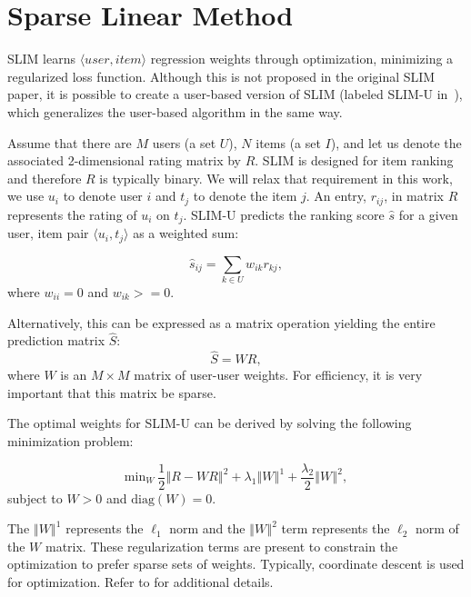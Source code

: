 \section{Sparse Linear Method}

SLIM learns $\langle user, item \rangle$ regression weights through optimization, minimizing a regularized loss function. Although this is not proposed in the original SLIM paper, it is possible to create a user-based version of SLIM (labeled SLIM-U in~\cite{zheng2014cslim}), which generalizes the user-based algorithm in the same way. 

Assume that there are $M$ users (a set $U$), $N$ items (a set $I$), and let us denote the associated 2-dimensional rating matrix by $R$. SLIM is designed for item ranking and therefore $R$ is typically binary. We will relax that requirement in this work, we use $u_i$ to denote user $i$ and $t_j$ to denote the item $j$. An entry, $r_{ij}$, in matrix $R$ represents the rating of $u_i$ on $t_j$. SLIM-U predicts the ranking score $\hat{s}$ for a given user, item pair $\langle u_i, t_j \rangle$ as a weighted sum:

\begin{equation}
    \hat{s}_{ij} = \sum_{k \in U}{w_{ik}r_{kj}}, 
\end{equation}
where $w_{ii} = 0$ and $w_{ik} >= 0$.
\vspace{0.25cm}

Alternatively, this can be expressed as a matrix operation yielding the entire prediction matrix $\hat{S}$:    
\begin{equation}
\hat{S} = WR,
\end{equation}
where $W$ is an $M \times M$ matrix of user-user weights. For efficiency, it is very important that this matrix be sparse.

The optimal weights for SLIM-U can be derived by solving the following minimization problem:

\begin{equation}
\text{min}_W~\frac{1}{2}\left\Vert R - WR \right\Vert^2 + 
    \lambda_1 \left\Vert W \right\Vert^1 +
    \frac{\lambda_2}{2}\left\Vert W \right\Vert^2,   
\end{equation}
subject to $W > 0$  and $\text{diag}(W) = 0$.

The $\left\Vert W \right\Vert^1$ represents the $\ell_1$ norm and the $\left\Vert W \right\Vert^2$ term represents the $\ell_2$ norm of the $W$ matrix. These regularization terms are present to constrain the optimization to prefer sparse sets of weights. Typically, coordinate descent is used for optimization. Refer to \cite{ning2011slim} for additional details. 

